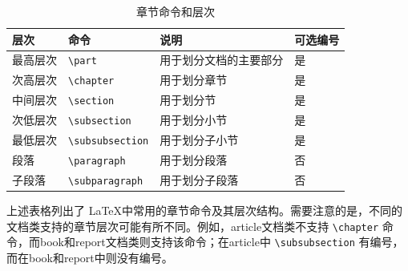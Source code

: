 \begin{table}[htbp]
  \caption{章节命令和层次}
  \centering
  \begin{tabular}{llll}
    \toprule
    层次 & 命令 & 说明 & 可选编号 \\
    \midrule
    最高层次 & \verb|\part| & 用于划分文档的主要部分 & 是 \\
    次高层次 & \verb|\chapter| & 用于划分章节 & 是 \\
    中间层次 & \verb|\section| & 用于划分节 & 是 \\
    次低层次 & \verb|\subsection| & 用于划分小节 & 是 \\
    最低层次 & \verb|\subsubsection| & 用于划分子小节 & 是 \\
    段落 & \verb|\paragraph| & 用于划分段落 & 否 \\
    子段落 & \verb|\subparagraph| & 用于划分子段落 & 否 \\
    \bottomrule
  \end{tabular}
\end{table}

上述表格列出了 \LaTeX 中常用的章节命令及其层次结构。需要注意的是，不同的文档类支持的章节层次可能有所不同。例如，article文档类不支持 \verb|\chapter| 命令，而book和report文档类则支持该命令；在article中 \verb|\subsubsection| 有编号，而在book和report中则没有编号。

